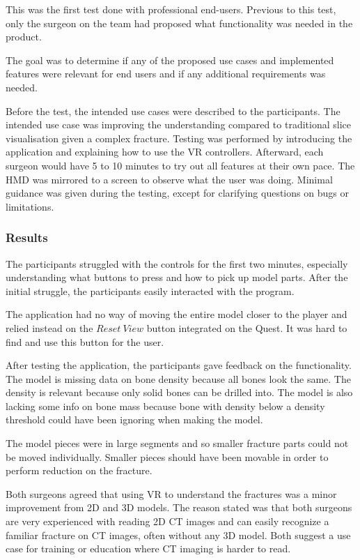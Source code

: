 \documentclass[a4paper]{report}
\begin{document}
This was the first test done with professional end-users. Previous to this test, only the surgeon on the team had proposed what functionality was needed in the product.

The goal was to determine if any of the proposed use cases and implemented features were relevant for end users and if any additional requirements was needed.

Before the test, the intended use cases were described to the participants. The intended use case was improving the understanding compared to traditional slice visualisation given a complex fracture.
Testing was performed by introducing the application and explaining how to use the VR controllers. Afterward, each surgeon would have 5 to 10 minutes to try out all features at their own pace. The HMD was mirrored to a screen to observe what the user was doing. Minimal guidance was given during the testing, except for clarifying questions on bugs or limitations.

\subsubsection{Results}
The participants struggled with the controls for the first two minutes, especially understanding what buttons to press and how to pick up model parts. After the initial struggle, the participants easily interacted with the program.

The application had no way of moving the entire model closer to the player and relied instead on the $Reset\ View$ button integrated on the Quest. It was hard to find and use this button for the user.

After testing the application, the participants gave feedback on the functionality.
The model is missing data on bone density because all bones look the same. The density is relevant because only solid bones can be drilled into. The model is also lacking some info on bone mass because bone with density below a density threshold could have been ignoring when making the model.

The model pieces were in large segments and so smaller fracture parts could not be moved individually. Smaller pieces should have been movable in order to perform reduction on the fracture.

Both surgeons agreed that using VR to understand the fractures was a minor improvement from 2D and 3D models.
The reason stated was that both surgeons are very experienced with reading 2D CT images and can easily recognize a familiar fracture on CT images, often without any 3D model. Both suggest a use case for training or education where CT imaging is harder to read.
\end{document}

